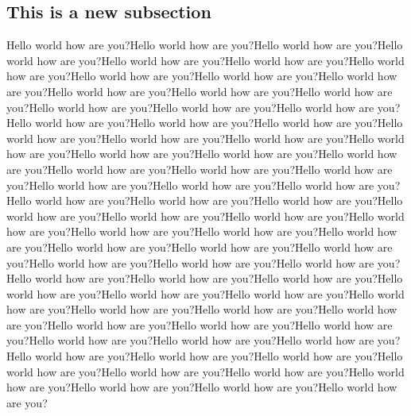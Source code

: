 \subsection{This is a new subsection}
Hello world how are you?Hello world how are you?Hello world how are you?Hello world how are you?Hello world how are you?Hello world how are you?Hello world how are you?Hello world how are you?Hello world how are you?Hello world how are you?Hello world how are you?Hello world how are you?Hello world how are you?Hello world how are you?Hello world how are you?Hello world how are you?Hello world how are you?Hello world how are you?Hello world how are you?Hello world how are you?Hello world how are you?Hello world how are you?Hello world how are you?Hello world how are you?Hello world how are you?Hello world how are you?Hello world how are you?Hello world how are you?Hello world how are you?Hello world how are you?Hello world how are you?Hello world how are you?Hello world how are you?Hello world how are you?Hello world how are you?Hello world how are you?Hello world how are you?Hello world how are you?Hello world how are you?Hello world how are you?Hello world how are you?Hello world how are you?Hello world how are you?Hello world how are you?Hello world how are you?Hello world how are you?Hello world how are you?Hello world how are you?Hello world how are you?Hello world how are you?Hello world how are you?Hello world how are you?Hello world how are you?Hello world how are you?Hello world how are you?Hello world how are you?Hello world how are you?Hello world how are you?Hello world how are you?Hello world how are you?Hello world how are you?Hello world how are you?Hello world how are you?Hello world how are you?Hello world how are you?Hello world how are you?Hello world how are you?Hello world how are you?Hello world how are you?Hello world how are you?Hello world how are you?Hello world how are you?Hello world how are you?Hello world how are you?
